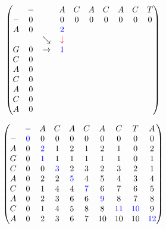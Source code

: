 \documentclass{beamer}
\begin{document}
\begin{frame}
	\[
\begin{pmatrix}
	  & - &         &  A             & C & A & C & A & C & T      \\
	- & 0 &         &  0             & 0 & 0 & 0 & 0 & 0 & 0      \\
	A & 0 &         & \color{blue}2  &   &   &   &   &   &       \\
	  &   & \searrow& \color{red}\downarrow     &   &   &   &   &   &       \\
	G & 0 & \rightarrow&\color{blue}1&   &   &   &   &   &       \\
	C & 0 &         &                &   &   &   &   &   &       \\
	A & 0 &         &                &   &   &   &   &   &       \\
	C & 0 &         &                &   &   &   &   &   &       \\
	A & 0 &         &                &   &   &   &   &   &       \\
	C & 0 &         &                &   &   &   &   &   &       \\    
	A & 0 &         &                &   &   &   &   &   &       
\end{pmatrix}
\]
\end{frame}


\begin{frame}
	\[
\begin{pmatrix}
	  & - & A & C & A & C & A & C & T & A \\
	- & \color{blue}0 & 0 & 0 & 0 & 0 & 0 & 0 & 0 & 0 \\
	A & 0 & \color{blue}2 & 1 & 2 & 1 & 2 & 1 & 0 & 2 \\
	G & 0 & \color{blue}1 & 1 & 1 & 1 & 1 & 1 & 0 & 1 \\
	C & 0 & 0 & \color{blue}3 & 2 & 3 & 2 & 3 & 2 & 1 \\
	A & 0 & 2 & 2 & \color{blue}5 & 4 & 5 & 4 & 3 & 4 \\
	C & 0 & 1 & 4 & 4 & \color{blue}7 & 6 & 7 & 6 & 5 \\
	A & 0 & 2 & 3 & 6 & 6 & \color{blue}9 & 8 & 7 & 8 \\
	C & 0 & 1 & 4 & 5 & 8 & 8 & \color{blue}11 & \color{blue}10 & 9 \\
	A & 0 & 2 & 3 & 6 & 7 & 10 & 10 & 10& \color{blue}12
\end{pmatrix}
\]
\end{frame}
\end{document}
